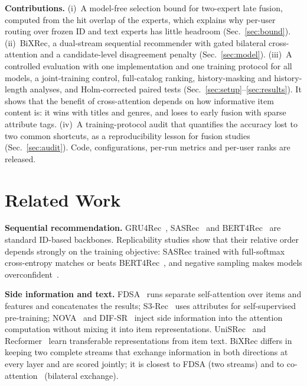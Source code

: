 \documentclass[conference]{IEEEtran}
\begin{document}
\textbf{Contributions.}
(i)~A model-free selection bound for two-expert late fusion, computed from the hit overlap of the experts, which
explains why per-user routing over frozen ID and text experts has little headroom (Sec.~\ref{sec:bound}).
(ii)~BiXRec, a dual-stream sequential recommender with gated bilateral cross-attention and a candidate-level
disagreement penalty (Sec.~\ref{sec:model}).
(iii)~A controlled evaluation with one implementation and one training protocol for all models, a joint-training
control, full-catalog ranking, history-masking and history-length analyses, and Holm-corrected paired tests
(Sec.~\ref{sec:setup}--\ref{sec:results}). It shows that the benefit of cross-attention depends on how informative
item content is: it wins with titles and genres, and loses to early fusion with sparse attribute tags.
(iv)~A training-protocol audit that quantifies the accuracy lost to two common shortcuts, as a reproducibility
lesson for fusion studies (Sec.~\ref{sec:audit}). Code, configurations, per-run metrics and per-user ranks are
released.

\section{Related Work}

\textbf{Sequential recommendation.} GRU4Rec~\cite{hidasi2016gru4rec}, SASRec~\cite{kang2018sasrec} and
BERT4Rec~\cite{sun2019bert4rec} are standard ID-based backbones. Replicability studies show that their relative
order depends strongly on the training objective: SASRec trained with full-softmax cross-entropy matches or beats
BERT4Rec~\cite{petrov2022bert4rec,klenitskiy2023dross}, and negative sampling makes models
overconfident~\cite{petrov2023gsasrec}.

\textbf{Side information and text.} FDSA~\cite{zhang2019fdsa} runs separate self-attention over items and features
and concatenates the results; S3-Rec~\cite{zhou2020s3rec} uses attributes for self-supervised pre-training;
NOVA~\cite{liu2021nova} and DIF-SR~\cite{xie2022difsr} inject side information into the attention computation
without mixing it into item representations. UniSRec~\cite{hou2022unisrec} and Recformer~\cite{li2023recformer}
learn transferable representations from item text. BiXRec differs in keeping two complete streams that exchange
information in both directions at every layer and are scored jointly; it is closest to FDSA (two streams) and to
co-attention~\cite{lu2019vilbert} (bilateral exchange).
\end{document}
